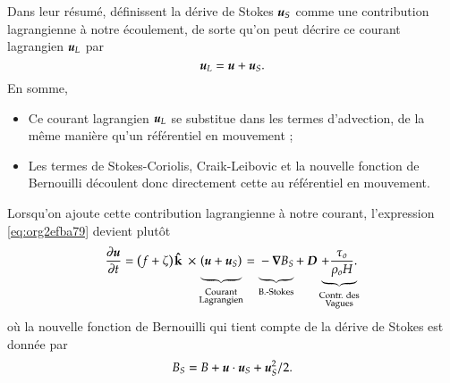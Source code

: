 \documentclass[10pt]{article}
\numberwithin{equation}{section}
\newcommand{\kvf}{\vb{\hat{k}}}
\newcommand{\uu}{\vb*{u}}
\newcommand{\grande}{\vphantom{\frac{1}{xx}}}
\newcommand{\pt}{\hspace{1pt}} %
\begin{document}
Dans leur résumé,   définissent la dérive de Stokes \(\uu_S\) comme une contribution lagrangienne à notre écoulement, de sorte qu'on peut décrire ce courant lagrangien \(\uu_L\) par
\begin{equation}
   \uu_L = \uu + \uu_S.
\end{equation}
En somme, 
\begin{itemize}
\item Ce courant lagrangien \(\uu_L\) se substitue dans les termes d'advection, de la même manière qu'un référentiel en mouvement ;
\item Les termes de Stokes-Coriolis, Craik-Leibovic et la nouvelle fonction de Bernouilli découlent donc directement cette au référentiel en mouvement. \bigskip
\end{itemize}

Lorsqu'on ajoute cette contribution lagrangienne à notre courant, l'expression \ref{eq:org2efba79} devient plutôt
\begin{equation}
   \pdv{\uu}{t} = \qty(f+\zeta)\pt \kvf\ \times\underbrace{\grande\qty(\uu + \uu_S)}_{\substack{\text{Courant} \\ \text{Lagrangien}}} = \underbrace{\grande-\gradient{B_S}}_\text{B.-Stokes} + \ \boldsymbol{D} \underbrace{+ \frac{\tau_o}{\rho_o H}.}_{\substack{\text{Contr. des} \\ \text{Vagues}}}
\end{equation}
où la nouvelle fonction de Bernouilli qui tient compte de la dérive de Stokes est donnée par
\begin{align}
   B_S = B + \uu\cdot\uu_S + \uu_S^2/2.
\end{align}


\end{document}
